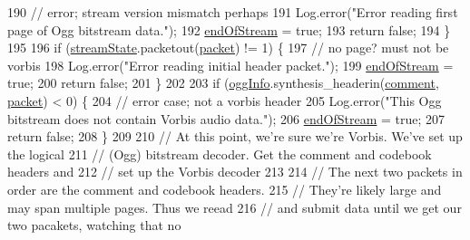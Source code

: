 \begin{DoxyCode}
190             \textcolor{comment}{// error; stream version mismatch perhaps}
191             Log.error(\textcolor{stringliteral}{"Error reading first page of Ogg bitstream data."});
192             \mbox{\hyperlink{classorg_1_1newdawn_1_1slick_1_1openal_1_1_ogg_input_stream_ac4c417186feeb02c3cd3ecfedee09831}{endOfStream}} = \textcolor{keyword}{true};
193             \textcolor{keywordflow}{return} \textcolor{keyword}{false};
194         \}
195 
196         \textcolor{keywordflow}{if} (\mbox{\hyperlink{classorg_1_1newdawn_1_1slick_1_1openal_1_1_ogg_input_stream_ac4bb8d3c4bd796cf4f20b21fdad304c0}{streamState}}.packetout(\mbox{\hyperlink{classorg_1_1newdawn_1_1slick_1_1openal_1_1_ogg_input_stream_a926c6e76df40d3920cf3801c39bd7c89}{packet}}) != 1) \{
197             \textcolor{comment}{// no page? must not be vorbis}
198             Log.error(\textcolor{stringliteral}{"Error reading initial header packet."});
199             \mbox{\hyperlink{classorg_1_1newdawn_1_1slick_1_1openal_1_1_ogg_input_stream_ac4c417186feeb02c3cd3ecfedee09831}{endOfStream}} = \textcolor{keyword}{true};
200             \textcolor{keywordflow}{return} \textcolor{keyword}{false};
201         \}
202 
203         \textcolor{keywordflow}{if} (\mbox{\hyperlink{classorg_1_1newdawn_1_1slick_1_1openal_1_1_ogg_input_stream_a21aa37c5c0611a79132c4d76fbefe460}{oggInfo}}.synthesis\_headerin(\mbox{\hyperlink{classorg_1_1newdawn_1_1slick_1_1openal_1_1_ogg_input_stream_adfe8fbcf485ce4dc911b8737cab63bb3}{comment}}, \mbox{\hyperlink{classorg_1_1newdawn_1_1slick_1_1openal_1_1_ogg_input_stream_a926c6e76df40d3920cf3801c39bd7c89}{packet}}) < 0) \{
204             \textcolor{comment}{// error case; not a vorbis header}
205             Log.error(\textcolor{stringliteral}{"This Ogg bitstream does not contain Vorbis audio data."});
206             \mbox{\hyperlink{classorg_1_1newdawn_1_1slick_1_1openal_1_1_ogg_input_stream_ac4c417186feeb02c3cd3ecfedee09831}{endOfStream}} = \textcolor{keyword}{true};
207             \textcolor{keywordflow}{return} \textcolor{keyword}{false};
208         \}
209 
210         \textcolor{comment}{// At this point, we're sure we're Vorbis.  We've set up the logical}
211         \textcolor{comment}{// (Ogg) bitstream decoder.  Get the comment and codebook headers and}
212         \textcolor{comment}{// set up the Vorbis decoder}
213 
214         \textcolor{comment}{// The next two packets in order are the comment and codebook headers.}
215         \textcolor{comment}{// They're likely large and may span multiple pages.  Thus we reead}
216         \textcolor{comment}{// and submit data until we get our two pacakets, watching that no}

\end{DoxyCode}
